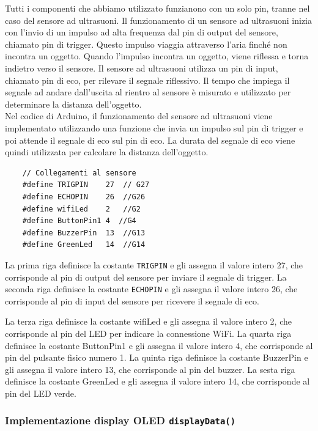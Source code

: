 Tutti i componenti che abbiamo utilizzato funzianono con un solo pin, tranne nel caso del sensore ad ultrasuoni. Il funzionamento di un sensore ad ultrasuoni inizia con l'invio di un impulso ad alta frequenza dal pin di output del sensore, chiamato pin di trigger. Questo impulso viaggia attraverso l'aria finché non incontra un oggetto. Quando l'impulso incontra un oggetto, viene riflessa e torna indietro verso il sensore. Il sensore ad ultrasuoni utilizza un pin di input, chiamato pin di eco, per rilevare il segnale riflessivo. Il tempo che impiega il segnale ad andare dall'uscita al rientro al sensore è misurato e utilizzato per determinare la distanza dell'oggetto. \\

Nel codice di Arduino, il funzionamento del sensore ad ultrasuoni viene implementato utilizzando una funzione che invia un impulso sul pin di trigger e poi attende il segnale di eco sul pin di eco. La durata del segnale di eco viene quindi utilizzata per calcolare la distanza dell'oggetto.


\begin{multicols}{2}
    \begin{verbatim}
    // Collegamenti al sensore
    #define TRIGPIN    27  // G27
    #define ECHOPIN    26  //G26
    #define wifiLed    2   //G2
    #define ButtonPin1 4  //G4
    #define BuzzerPin  13  //G13
    #define GreenLed   14  //G14
    \end{verbatim}
    \columnbreak
    La prima riga definisce la costante \texttt{TRIGPIN} e gli assegna il valore intero 27, che corrisponde al pin di output del sensore per inviare il segnale di trigger. La seconda riga definisce la costante \texttt{ECHOPIN} e gli assegna il valore intero 26, che corrisponde al pin di input del sensore per ricevere il segnale di eco. 
\end{multicols}
La terza riga definisce la costante wifiLed e gli assegna il valore intero 2, che corrisponde al pin del LED per indicare la connessione WiFi. La quarta riga definisce la costante ButtonPin1 e gli assegna il valore intero 4, che corrisponde al pin del pulsante fisico numero 1. La quinta riga definisce la costante BuzzerPin e gli assegna il valore intero 13, che corrisponde al pin del buzzer. La sesta riga definisce la costante GreenLed e gli assegna il valore intero 14, che corrisponde al pin del LED verde. 

\subsubsection{Implementazione display OLED \texttt{displayData()}}

